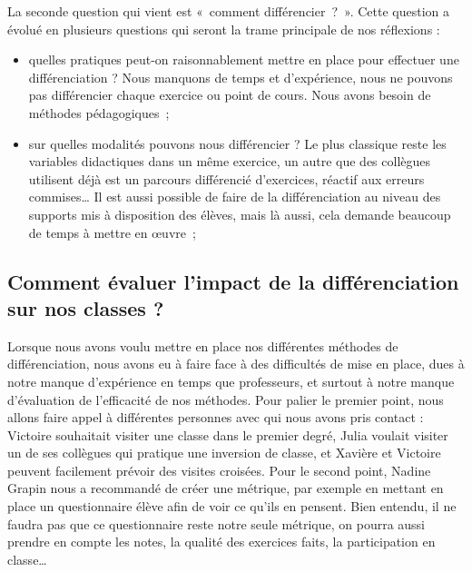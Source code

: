 La seconde question qui vient est « comment différencier ? ». Cette question a évolué en plusieurs questions qui seront la trame principale de nos réflexions :
\begin{itemize}
    \item quelles pratiques peut-on raisonnablement mettre en place pour effectuer une différenciation ? Nous manquons de temps et d’expérience, nous ne pouvons pas différencier chaque exercice ou point de cours. Nous avons besoin de méthodes pédagogiques ;
    \item sur quelles modalités pouvons nous différencier ? Le plus classique reste les variables didactiques dans un même exercice, un autre que des collègues utilisent déjà est un parcours différencié d’exercices, réactif aux erreurs commises… Il est aussi possible de faire de la différenciation au niveau des supports mis à disposition des élèves, mais là aussi, cela demande beaucoup de temps à mettre en œuvre ;
\end{itemize}


\subsection{Comment évaluer l'impact de la différenciation sur nos classes ?}


Lorsque nous avons voulu mettre en place nos différentes méthodes de différenciation, nous avons eu à faire face à des difficultés de mise en place, dues à notre manque d’expérience en temps que professeurs, et surtout à notre manque d’évaluation de l’efficacité de nos méthodes. Pour palier le premier point, nous allons faire appel à différentes personnes avec qui nous avons pris contact : Victoire souhaitait visiter une classe dans le premier degré, Julia voulait visiter un de ses collègues qui pratique une inversion de classe, et Xavière et Victoire peuvent facilement prévoir des visites croisées. Pour le second point, Nadine Grapin nous a recommandé de créer une métrique, par exemple en mettant en place un questionnaire élève afin de voir ce qu’ils en pensent. Bien entendu, il ne faudra pas que ce questionnaire reste notre seule métrique, on pourra aussi prendre en compte les notes, la qualité des exercices faits, la participation en classe…

